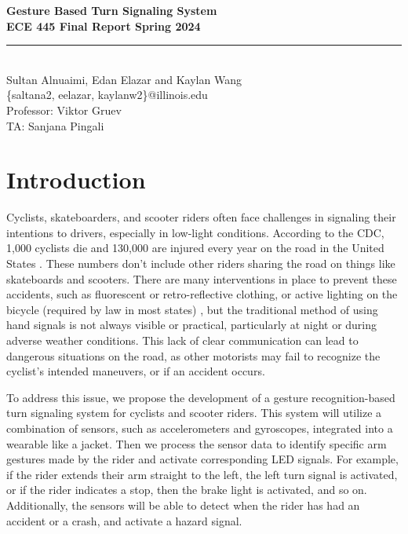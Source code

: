 \documentclass[12pt]{article}
\begin{document}
\begin{titlepage}
\centering
{}
{\LARGE\textbf{Gesture Based Turn Signaling System }}\\[1cm] 
{\large\textbf{ECE 445 Final Report Spring 2024}}\\[0.3cm]
\rule{\textwidth}{1pt}\\
{\Large Sultan Alnuaimi, Edan Elazar and Kaylan Wang}\\[0.5cm] 
{\small \{saltana2, eelazar, kaylanw2\}@illinois.edu}\\[0.5cm] 
{\small Professor: Viktor Gruev}\\[0.5cm]
{\small TA: Sanjana Pingali}\\[1cm]

\end{titlepage} 

\tableofcontents 
\newpage
\section{Introduction}

Cyclists, skateboarders, and scooter riders often face 
challenges in signaling their intentions to drivers,
especially in low-light conditions. According to the CDC, 
1,000 cyclists die and 130,000 are injured every year on 
the road in the United States \cite{CDC2024BicycleSafety}. 
These numbers don’t include other riders sharing the road on 
things like skateboards and scooters. There are many interventions 
in place to prevent these accidents, such as fluorescent or 
retro-reflective clothing, or active lighting on the bicycle 
(required by law in most states) \cite{CDC2024BicycleSafety}, 
but the traditional method of using hand signals is not always 
visible or practical, particularly at night or during adverse 
weather conditions. This lack of clear communication can lead 
to dangerous situations on the road, as other motorists may 
fail to recognize the cyclist's intended maneuvers, or if an 
accident occurs. 

To address this issue, we propose the development of a gesture 
recognition-based turn signaling system for cyclists and scooter 
riders. This system will utilize a combination of sensors, such 
as accelerometers and gyroscopes, integrated into a wearable 
like a jacket. Then we process the sensor data to identify 
specific arm gestures made by the rider and activate corresponding 
LED signals. For example, if the rider extends their arm straight 
to the left, the left turn signal is activated, or if the rider 
indicates a stop, then the brake light is activated, and so on. 
Additionally, the sensors will be able to detect when the rider 
has had an accident or a crash, and activate a hazard signal. 
\end{document}
